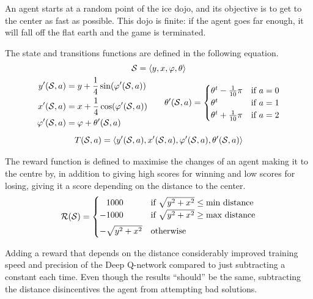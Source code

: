 An agent starts at a random point of the ice dojo, and its objective is to get to the center as fast as possible.
This dojo is finite: if the agent goes far enough, it will fall off the flat earth and the game is terminated.

The state and transitions functions are defined in the following equation.
\newcommand{\statet}{\left< y, x, \varphi, \theta \right>}
\begin{gather*}
	\state = \statet \\
	\begin{aligned}
		y'(\state, a) &= y + \frac{1}{4} \sin(\varphi'(\state, a)) \\
		x'(\state, a) &= x + \frac{1}{4} \cos(\varphi'(\state, a)) \\
		\varphi'(\state, a) &= \varphi + \theta'(\state, a)
	\end{aligned}
	\qquad
	\theta'(\state, a)= \begin{cases}
		\theta^t - \frac{1}{10} \pi & \text{if } a = 0 \\
		\theta^t & \text{if } a = 1 \\
		\theta^t + \frac{1}{10} \pi & \text{if } a = 2
	\end{cases} \\[1ex]
	T(\state, a) = \left< y'(\state, a), x'(\state, a), \varphi'(\state, a), \theta'(\state, a) \right>
\end{gather*}

The reward function is defined to maximise the changes of an agent making it to the centre by, in addition to giving high scores for winning and low scores for losing, giving it a score depending on the distance to the center.
\begin{equation*}
	\mathcal{R}(\mathcal{S}) = \begin{cases}
		\phantom{+}1000 & \text{if } \sqrt{y^2 + x^2} \leq \text{min distance} \\
		-1000 & \text{if } \sqrt{y^2 + x^2} \geq \text{max distance} \\[1ex]
		-\sqrt{y^2 + x^2} & \text{otherwise}
	\end{cases}
\end{equation*}

Adding a reward that depends on the distance considerably improved training speed and precision of the Deep Q-network compared to just subtracting a constant each time.
Even though the results ``should'' be the same, subtracting the distance disincentives the agent from attempting bad solutions.

\newpage{}
